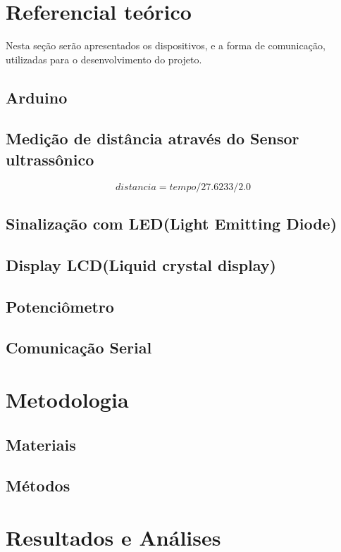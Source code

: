 \documentclass[conference]{IEEEtran}
\begin{document}
\section{Referencial teórico}
Nesta seção serão apresentados os dispositivos, e a forma de comunicação, utilizadas para o desenvolvimento do projeto.
\subsection{Arduino}
\subsection{Medição de distância através do Sensor ultrassônico}

\begin{equation}
    distancia = tempo / 27.6233 / 2.0 \label{eq}
\end{equation}

\subsection{Sinalização com LED(Light Emitting Diode)}
\subsection{Display LCD(Liquid crystal display)}
\subsection{Potenciômetro}
\subsection{Comunicação Serial}

\section{Metodologia}

\subsection{Materiais}

\subsection{Métodos}


\section{Resultados e Análises}
\end{document}

